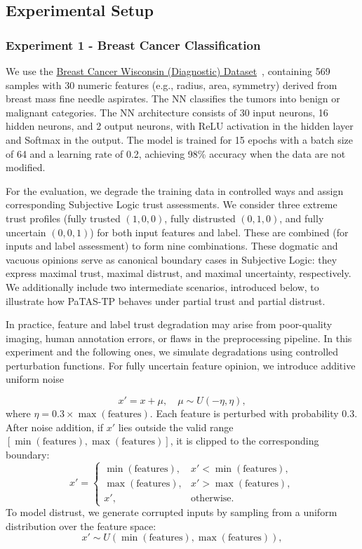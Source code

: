 \subsection{Experimental Setup }
\subsubsection{Experiment 1 - Breast Cancer Classification}\label{exp:1}
We use the \href{https://archive.ics.uci.edu/dataset/17/breast+cancer+wisconsin+diagnostic}{Breast Cancer Wisconsin (Diagnostic) Dataset}~\cite{breastcancer-wisconsin}, containing 569 samples with 30 numeric features (e.g., radius, area, symmetry) derived from breast mass fine needle aspirates. The \ac{NN} classifies the tumors into benign or malignant categories.
The \ac{NN} architecture consists of 30 input neurons, 16 hidden neurons, and 2 output neurons, with ReLU activation in the hidden layer and Softmax in the output. The model is trained for 15 epochs with a batch size of 64 and a learning rate of 0.2, achieving 98\% accuracy when the data are not modified.

For the evaluation, we degrade the training data in controlled ways and assign corresponding Subjective Logic trust assessments. We consider three extreme trust profiles (fully trusted \((1,0,0)\), fully distrusted \((0,1,0)\), and fully uncertain \((0,0,1)\)) for both input features and label. These are combined (for inputs and label assessment) to form nine combinations. These dogmatic and vacuous opinions serve as canonical boundary cases in Subjective Logic: they express maximal trust, maximal distrust, and maximal uncertainty, respectively. We additionally include two intermediate scenarios, introduced below, to illustrate how \ac{PaTAS-TP} behaves under partial trust and partial distrust.

In practice, feature and label trust degradation may arise from poor-quality imaging, human annotation errors, or flaws in the preprocessing pipeline. In this experiment and the following ones, we simulate degradations using controlled perturbation functions. For fully uncertain feature opinion, we introduce additive uniform noise 

\[
x' = x + \mu, \quad \mu \sim U(-\eta, \eta),
\]
where 
\(
\eta = 0.3 \times \max(\text{features}).
\)
Each feature is perturbed with probability $0.3$. 
After noise addition, if $x'$ lies outside the valid range 
$[\min(\text{features}), \max(\text{features})]$, it is clipped to the corresponding boundary:
\[
x' = 
\begin{cases}
\min(\text{features}), & x' < \min(\text{features}), \\
\max(\text{features}), & x' > \max(\text{features}), \\
x', & \text{otherwise}.
\end{cases}
\]
To model distrust, we generate corrupted inputs by sampling from a uniform distribution over the feature space:
\[
x' \sim U\left(\min\left(\text{features}\right), \max\left(\text{features}\right)\right),
\]

